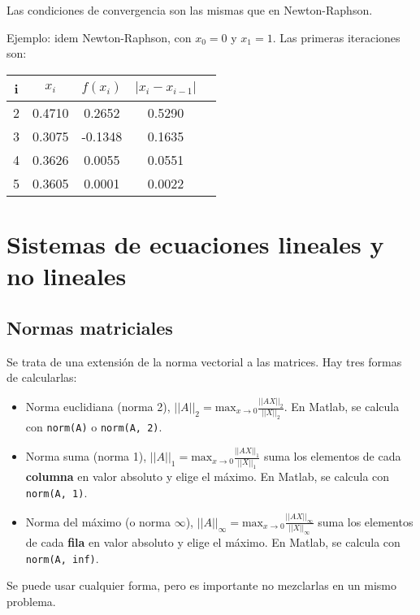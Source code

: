 \documentclass{article}
\begin{document}
Las condiciones de convergencia son las mismas que en Newton-Raphson.

Ejemplo: idem Newton-Raphson, con $x_0 = 0$ y $x_1 = 1$. Las primeras 
iteraciones son:

\begin{table}[h]
\centering
\begin{tabular}{ccccc}
    i & $x_i$  & $f(x_i)$ & $|x_i - x_{i-1}|$ \\\hline
    2 & 0.4710 & 0.2652   & 0.5290            \\
    3 & 0.3075 & -0.1348  & 0.1635            \\
    4 & 0.3626 & 0.0055   & 0.0551            \\
    5 & 0.3605 & 0.0001   & 0.0022
\end{tabular}
\end{table}

\section{Sistemas de ecuaciones lineales y no lineales}

\subsection{Normas matriciales}

Se trata de una extensión de la norma vectorial a las matrices. Hay tres formas
de calcularlas:

\begin{itemize}
    \item Norma euclidiana (norma 2), 
        $||A||_2 = \text{max}_{x\to0} \frac{||AX||_2}{||X||_2}$. 
        En Matlab, se calcula con \verb|norm(A)| o \verb|norm(A, 2)|.
    \item Norma suma (norma 1), 
        $||A||_1 = \text{max}_{x\to0} \frac{||AX||_1}{||X||_1}$ suma los 
        elementos de cada \textbf{columna} en valor absoluto y elige el máximo. 
        En Matlab, se calcula con \verb|norm(A, 1)|.
    \item Norma del máximo (o norma $\infty$), 
        $||A||_\infty = \text{max}_{x\to0} \frac{||AX||_\infty}{||X||_\infty}$ 
        suma los elementos de cada \textbf{fila} en valor absoluto y elige el 
        máximo. En Matlab, se calcula con \verb|norm(A, inf)|.
\end{itemize}

Se puede usar cualquier forma, pero es importante no mezclarlas en un mismo 
problema.
\end{document}
